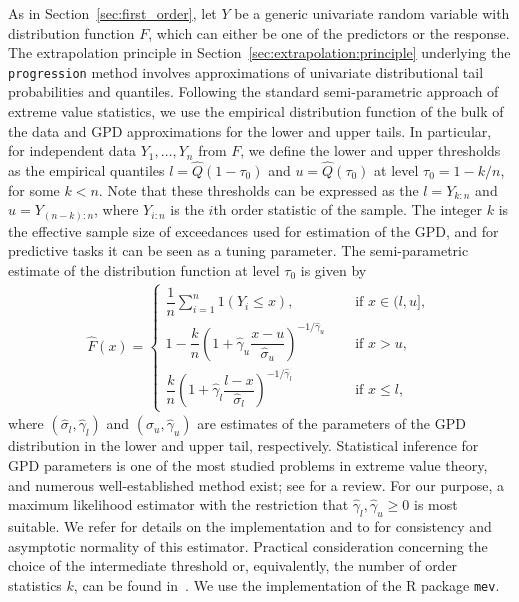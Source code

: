\documentclass{statsoc}
\theoremstyle{break}
\newcommand{\tauzero}{\tau_0}
\begin{document}
As in Section~\ref{sec:first_order}, let $Y$ be
a generic univariate random variable with distribution
 function $F$, which can either be one of the predictors or the response.
The extrapolation principle in Section~\ref{sec:extrapolation:principle} underlying the \texttt{progression} method involves approximations of univariate distributional tail probabilities and quantiles.   
Following the standard semi-parametric approach of extreme value statistics, we use the empirical distribution function of the bulk of the data and GPD approximations for the lower and upper tails. 
In particular, for independent data $Y_1,\dots, Y_n$ from $F$, we define the lower and upper thresholds as the empirical quantiles $l = \widehat Q(1-\tauzero)$ and $u = \widehat Q(\tauzero)$ at level $\tau_0 = 1-k/n$, for some $k<n$. Note that these thresholds can be expressed as the $l = Y_{k:n}$ and $u = Y_{(n-k):n}$, where $Y_{i:n}$ is the $i$th order statistic of the sample. 
 The integer $k$ is the effective sample size of exceedances used for estimation of the GPD, and for predictive tasks it can be seen as a tuning parameter.
The semi-parametric estimate of the distribution function at level $\tauzero$ is given by 
\begin{eqnarray}\label{eq:F}
	\widehat{F}(x) = \begin{cases}
		\dfrac{1}{n}\displaystyle\sum\limits_{i=1}^n 1(Y_{i} \leq x)  ,  \quad &\text{ if }    x \in (l,u] , \\
		1 - \dfrac{k}{n} \left(1 + \widehat{\gamma}_u \dfrac{x - u}{{\widehat{\sigma}_u}}\right)^{-1/\widehat{\gamma}_u}  \quad &\text{ if }  x > u,  \\
		\dfrac{k}{n} \left(1 + \widehat{\gamma}_l \dfrac{l - x }{{\widehat{\sigma}_l}}\right)^{-1/\widehat{\gamma}_l}  \quad &\text{ if }  x \leq l,  
	\end{cases}
\end{eqnarray}
where $(\widehat \sigma_l, \widehat \gamma_l)$ and $(\widehat \sigma_u, \widehat \gamma_u)$ are estimates of the parameters of the GPD distribution in the lower and upper tail, respectively.
Statistical inference for GPD parameters is one of the most studied problems in extreme value theory, and numerous well-established method exist; see \cite{bel2023} for a review. For our purpose, a maximum likelihood estimator with the restriction that $\widehat \gamma_l, \widehat \gamma_u \geq 0$ is most suitable. We refer \cite{coles:2001} for details on the implementation and to \cite{haan:ferreira:2006} for  consistency and asymptotic normality of this estimator. Practical consideration concerning the choice of the intermediate threshold or, equivalently, the number of order statistics $k$, can be found in~\cite{cae2016}. We use the implementation of the R package \texttt{mev}.
\end{document}
